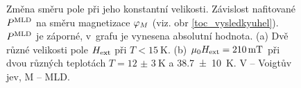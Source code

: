 \begin{figure}[htbp]\centering
{}
	\caption{Změna směru pole při jeho konstantní velikosti. Závislost nafitované $P^{\text{MLD}}$ na směru magnetizace $\varphi_M$ (viz. obr \ref{toc_vysledkyuhel}). $P^{\text{MLD}}$ je záporné, v~grafu je vynesena absolutní hodnota. (a) Dvě různé velikosti pole $H_\text{ext}$ při $T<\SI{15}{\kelvin}$. (b) $\mu_0H_\text{ext}=\SI{210}{\milli\tesla}$ při dvou různých teplotách $T=\SI{12(3)}{\kelvin}$ a \SI{38,7(10)}{\kelvin}. V -- Voigtův jev, M -- MLD.}\label{toc_vysledkypmld}
\end{figure}